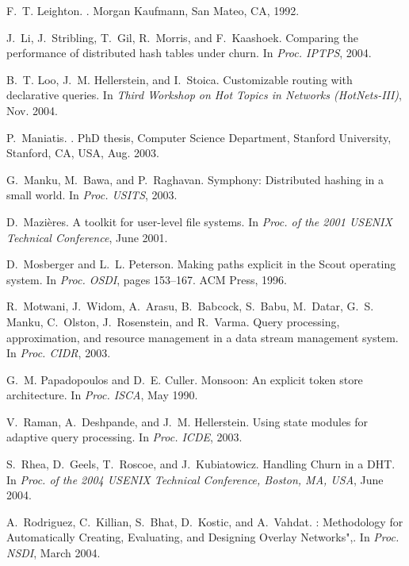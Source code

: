 \documentclass{sig-alt-full}
\begin{document}
{\begin{thebibliography}{10}
F.~T. Leighton.
.
\newblock Morgan Kaufmann, San Mateo, CA, 1992.

J.~Li, J.~Stribling, T.~Gil, R.~Morris, and F.~Kaashoek.
\newblock Comparing the performance of distributed hash tables under churn.
\newblock In {\em Proc. IPTPS}, 2004.

B.~T. Loo, J.~M. Hellerstein, and I.~Stoica.
\newblock Customizable routing with declarative queries.
\newblock In {\em Third Workshop on Hot Topics in Networks (HotNets-III)}, Nov.
  2004.

P.~Maniatis.
.
\newblock PhD thesis, Computer Science Department, Stanford University,
  Stanford, {CA}, {USA}, Aug. 2003.

G.~Manku, M.~Bawa, and P.~Raghavan.
\newblock Symphony: Distributed hashing in a small world.
\newblock In {\em Proc. USITS}, 2003.

D.~Mazi\`eres.
\newblock A toolkit for user-level file systems.
\newblock In {\em Proc. of the 2001 USENIX Technical Conference}, June 2001.

D.~Mosberger and L.~L. Peterson.
\newblock Making paths explicit in the {S}cout operating system.
\newblock In {\em Proc. OSDI}, pages 153--167. ACM Press, 1996.

R.~Motwani, J.~Widom, A.~Arasu, B.~Babcock, S.~Babu, M.~Datar, G.~S. Manku,
  C.~Olston, J.~Rosenstein, and R.~Varma.
\newblock Query processing, approximation, and resource management in a data
  stream management system.
\newblock In {\em Proc. CIDR}, 2003.

G.~M. Papadopoulos and D.~E. Culler.
\newblock Monsoon: An explicit token store architecture.
\newblock In {\em Proc. ISCA}, May 1990.

V.~Raman, A.~Deshpande, and J.~M. Hellerstein.
\newblock Using state modules for adaptive query processing.
\newblock In {\em Proc. ICDE}, 2003.

S.~Rhea, D.~Geels, T.~Roscoe, and J.~Kubiatowicz.
\newblock Handling {C}hurn in a {DHT}.
\newblock In {\em Proc. of the 2004 USENIX Technical Conference, Boston, MA,
  USA}, June 2004.

A.~Rodriguez, C.~Killian, S.~Bhat, D.~Kostic, and A.~Vahdat.
: {M}ethodology for {A}utomatically {C}reating,
  {E}valuating, and {D}esigning {O}verlay {N}etworks",.
\newblock In {\em Proc. NSDI}, March 2004.


\end{thebibliography}}
\end{document}
